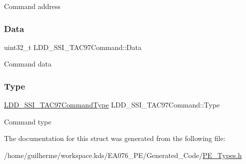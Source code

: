 Command address \mbox{\label{struct_l_d_d___s_s_i___t_a_c97_command_abc16535d09d61f2c3f885adf91632117}} 
\subsubsection{\texorpdfstring{Data}{Data}}
{\footnotesize\ttfamily uint32\+\_\+t L\+D\+D\+\_\+\+S\+S\+I\+\_\+\+T\+A\+C97\+Command\+::\+Data}

Command data \mbox{\label{struct_l_d_d___s_s_i___t_a_c97_command_ac7226beaf57a764f71faf7e822e27a6e}} 
\subsubsection{\texorpdfstring{Type}{Type}}
{\footnotesize\ttfamily \hyperlink{group___p_e___types__module_gac7398329f7fdf5c8834b026e63f5edc2}{L\+D\+D\+\_\+\+S\+S\+I\+\_\+\+T\+A\+C97\+Command\+Type} L\+D\+D\+\_\+\+S\+S\+I\+\_\+\+T\+A\+C97\+Command\+::\+Type}

Command type 

The documentation for this struct was generated from the following file\+:\begin{DoxyCompactItemize}
\item 
/home/guilherme/workspace.\+kds/\+E\+A076\+\_\+\+P\+E/\+Generated\+\_\+\+Code/\hyperlink{_p_e___types_8h}{P\+E\+\_\+\+Types.\+h}\end{DoxyCompactItemize}
